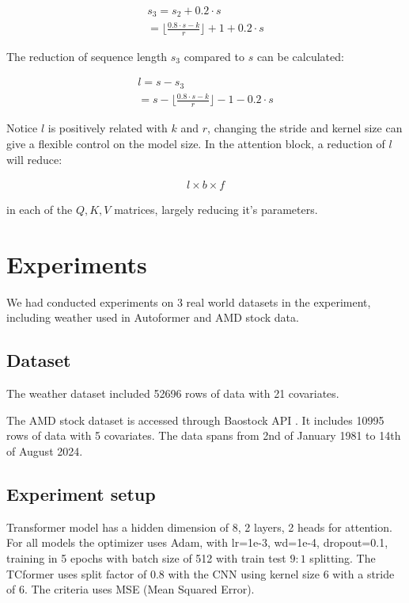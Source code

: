 \documentclass[10pt,journal,compsoc]{IEEEtran}
\begin{document}
\begin{gather}
    s_3=s_2+0.2\cdot s\\
    =\lfloor\frac{0.8\cdot s-k}{r} \rfloor+1+0.2\cdot s
\end{gather}

The reduction of sequence length $s_3$ compared to $s$ can be calculated:

\begin{gather}
    l=s-s_3\\
    =s-\lfloor\frac{0.8\cdot s-k}{r} \rfloor-1-0.2\cdot s
\end{gather}

Notice $l$ is positively related with $k$ and $r$, changing the stride and kernel size can give a flexible control on the model size. In the attention block, a reduction of $l$ will reduce:

\begin{gather}
    l\times b\times f
\end{gather}

in each of the $Q,K,V$ matrices, largely reducing it's parameters.

\section{Experiments}

We had conducted experiments on 3 real world datasets in the experiment, including weather used in Autoformer \cite{autoformer} and AMD stock data. 

\subsection{Dataset}

The weather dataset included 52696 rows of data with 21 covariates. 

The AMD stock dataset is accessed through Baostock API \cite{baostock}. It includes 10995 rows of data with 5 covariates. The data spans from 2nd of January 1981 to 14th of August 2024. 

\subsection{Experiment setup}

Transformer model has a hidden dimension of 8, 2 layers, 2 heads for attention. For all models the optimizer uses Adam, with lr=1e-3, wd=1e-4, dropout=0.1, training in 5 epochs with batch size of 512 with train test $9:1$ splitting. The TCformer uses split factor of 0.8 with the CNN using kernel size 6 with a stride of 6. The criteria uses MSE (Mean Squared Error). 
\end{document}
